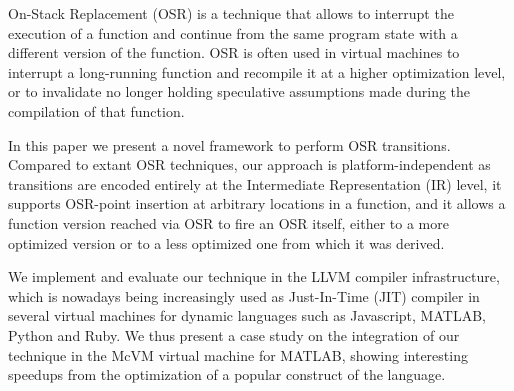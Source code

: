 On-Stack Replacement (OSR) is a technique that allows to interrupt the execution of a function and continue from the same program state with a different version of the function. OSR is often used in virtual machines to interrupt a long-running function and recompile it at a higher optimization level, or to invalidate no longer holding speculative assumptions made during the compilation of that function.

In this paper we present a novel framework to perform OSR transitions. Compared to extant OSR techniques, our approach is platform-independent as transitions are encoded entirely at the Intermediate Representation (IR) level, it supports OSR-point insertion at arbitrary locations in a function, and it allows a function version reached via OSR to fire an OSR itself, either to a more optimized version or to a less optimized one from which it was derived.

We implement and evaluate our technique in the LLVM compiler infrastructure, which is nowadays being increasingly used as Just-In-Time (JIT) compiler in several virtual machines for dynamic languages such as Javascript, MATLAB, Python and Ruby. We thus present a case study on the integration of our technique in the McVM virtual machine for MATLAB, showing interesting speedups from the optimization of a popular construct of the language.